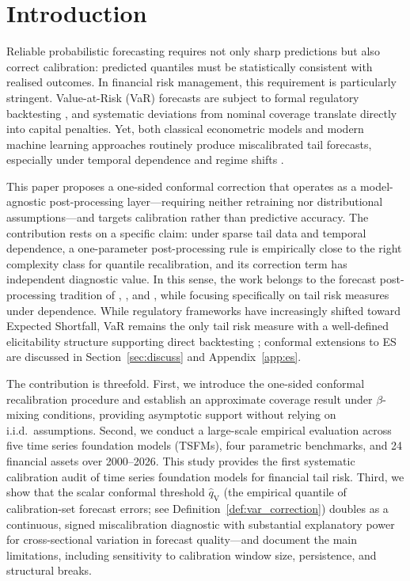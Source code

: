 \documentclass[preprint,11pt,authoryear]{elsarticle}
\newcommand{\1}{\boldsymbol{1}}
\newcommand{\qV}{\hat{q}_{\scriptscriptstyle\mathrm{V}}}
\begin{document}
	\section{Introduction}
	\label{sec:intro}
	
	Reliable probabilistic forecasting requires not only sharp
	predictions but also correct calibration: predicted quantiles
	must be statistically consistent with realised outcomes. In
	financial risk management, this requirement is particularly
	stringent. Value-at-Risk (VaR) forecasts are subject to formal
	regulatory backtesting \citep{basel1996}, and systematic
	deviations from nominal coverage translate directly into
	capital penalties. Yet, both classical econometric models and
	modern machine learning approaches routinely produce
	miscalibrated tail forecasts, especially under temporal
	dependence and regime shifts
	\citep{christoffersen1998, nolde2017elicitability,
		goel2024tsfmvar, pele2025llmvar}.
	
	This paper proposes a one-sided conformal correction that operates as a model-agnostic post-processing layer---requiring neither retraining nor distributional assumptions---and targets calibration rather than predictive accuracy. The contribution rests on a specific claim: under sparse tail data and temporal dependence, a one-parameter post-processing rule is empirically close to the right complexity class for quantile recalibration, and its correction term has independent diagnostic value. In this sense, the work belongs to the forecast post-processing tradition of \citet{gneiting2013combining}, \citet{brehmer2021properification}, and \citet{taillardat2016calibrated}, while focusing specifically on tail risk measures under dependence. While regulatory frameworks have increasingly shifted toward Expected Shortfall, VaR remains the only tail risk measure with a well-defined elicitability structure supporting direct backtesting \citep{gneiting2011making}; conformal extensions to ES are discussed in Section~\ref{sec:discuss} and Appendix~\ref{app:es}.

	The contribution is threefold. First, we introduce the one-sided conformal recalibration procedure and establish an approximate coverage result under $\beta$-mixing conditions, providing asymptotic support without relying on i.i.d.\ assumptions. Second, we conduct a large-scale empirical evaluation across five time series foundation models (TSFMs), four parametric benchmarks, and 24 financial assets over 2000--2026. This study provides the first systematic calibration audit of time series foundation models for financial tail risk. Third, we show that the scalar conformal threshold $\qV$ (the empirical quantile of calibration-set forecast errors; see Definition~\ref{def:var_correction}) doubles as a continuous, signed miscalibration diagnostic with substantial explanatory power for cross-sectional variation in forecast quality---and document the main limitations, including sensitivity to calibration window size, persistence, and structural breaks.
\end{document}
